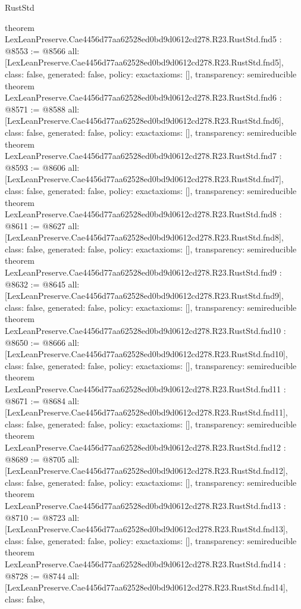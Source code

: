 \begin{lexlean}{RustStd}
\begin{coremodule}
{}
theorem LexLeanPreserve.Cae4456d77aa62528ed0bd9d0612cd278.R23.RustStd.fnd5 : @8553 := @8566 {
  all: [LexLeanPreserve.Cae4456d77aa62528ed0bd9d0612cd278.R23.RustStd.fnd5],
  class: false,
  generated: false,
  policy: exact{axioms: []},
  transparency: semireducible
}
theorem LexLeanPreserve.Cae4456d77aa62528ed0bd9d0612cd278.R23.RustStd.fnd6 : @8571 := @8588 {
  all: [LexLeanPreserve.Cae4456d77aa62528ed0bd9d0612cd278.R23.RustStd.fnd6],
  class: false,
  generated: false,
  policy: exact{axioms: []},
  transparency: semireducible
}
theorem LexLeanPreserve.Cae4456d77aa62528ed0bd9d0612cd278.R23.RustStd.fnd7 : @8593 := @8606 {
  all: [LexLeanPreserve.Cae4456d77aa62528ed0bd9d0612cd278.R23.RustStd.fnd7],
  class: false,
  generated: false,
  policy: exact{axioms: []},
  transparency: semireducible
}
theorem LexLeanPreserve.Cae4456d77aa62528ed0bd9d0612cd278.R23.RustStd.fnd8 : @8611 := @8627 {
  all: [LexLeanPreserve.Cae4456d77aa62528ed0bd9d0612cd278.R23.RustStd.fnd8],
  class: false,
  generated: false,
  policy: exact{axioms: []},
  transparency: semireducible
}
theorem LexLeanPreserve.Cae4456d77aa62528ed0bd9d0612cd278.R23.RustStd.fnd9 : @8632 := @8645 {
  all: [LexLeanPreserve.Cae4456d77aa62528ed0bd9d0612cd278.R23.RustStd.fnd9],
  class: false,
  generated: false,
  policy: exact{axioms: []},
  transparency: semireducible
}
theorem LexLeanPreserve.Cae4456d77aa62528ed0bd9d0612cd278.R23.RustStd.fnd10 : @8650 := @8666 {
  all: [LexLeanPreserve.Cae4456d77aa62528ed0bd9d0612cd278.R23.RustStd.fnd10],
  class: false,
  generated: false,
  policy: exact{axioms: []},
  transparency: semireducible
}
theorem LexLeanPreserve.Cae4456d77aa62528ed0bd9d0612cd278.R23.RustStd.fnd11 : @8671 := @8684 {
  all: [LexLeanPreserve.Cae4456d77aa62528ed0bd9d0612cd278.R23.RustStd.fnd11],
  class: false,
  generated: false,
  policy: exact{axioms: []},
  transparency: semireducible
}
theorem LexLeanPreserve.Cae4456d77aa62528ed0bd9d0612cd278.R23.RustStd.fnd12 : @8689 := @8705 {
  all: [LexLeanPreserve.Cae4456d77aa62528ed0bd9d0612cd278.R23.RustStd.fnd12],
  class: false,
  generated: false,
  policy: exact{axioms: []},
  transparency: semireducible
}
theorem LexLeanPreserve.Cae4456d77aa62528ed0bd9d0612cd278.R23.RustStd.fnd13 : @8710 := @8723 {
  all: [LexLeanPreserve.Cae4456d77aa62528ed0bd9d0612cd278.R23.RustStd.fnd13],
  class: false,
  generated: false,
  policy: exact{axioms: []},
  transparency: semireducible
}
theorem LexLeanPreserve.Cae4456d77aa62528ed0bd9d0612cd278.R23.RustStd.fnd14 : @8728 := @8744 {
  all: [LexLeanPreserve.Cae4456d77aa62528ed0bd9d0612cd278.R23.RustStd.fnd14],
  class: false,
}
\end{coremodule}
\end{lexlean}

